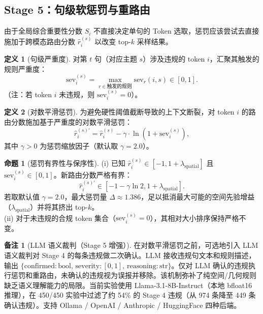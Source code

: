 \documentclass[11pt,a4paper]{article}
\theoremstyle{definition}
\newtheorem{definition}{定义}[section]
\newtheorem{proposition}{命题}[section]
\newtheorem{remark}{备注}[section]
\begin{document}
\subsection{Stage 5：句级软惩罚与重路由}

由于全局综合重要性分数 $S_i$ 不直接决定单句的 Token 选取，惩罚应该尝试去直接施加于跨模态路由分数 $\hat{r}_i^{(s)}$ 以改变 top-$k$ 采样结果。

\begin{definition}[句级严重度]
对第 $t$ 句（对应主题 $s$）涉及违规的 token $i$，汇聚其触发的规则严重度：
\begin{equation}
\mathrm{sev}_i^{(s)} = \max_{r \in \text{触发的规则}} \mathrm{sev}_r(i, s) \in [0,1].
\end{equation}
（注：若 token $i$ 未违规，则 $\mathrm{sev}_i^{(s)} = 0$）。
\end{definition}

\begin{definition}[对数平滑惩罚]
为避免硬性阈值截断导致的上下文断裂，对 token $i$ 的路由分数施加基于严重度的对数平滑惩罚：
\begin{equation}\label{eq:penalty}
\hat{r}_i^{(s)\prime} = \hat{r}_i^{(s)} - \gamma \cdot \ln(1 + \mathrm{sev}_i^{(s)}),
\end{equation}
其中 $\gamma > 0$ 为惩罚缩放因子（默认取 $\gamma = 2.0$）。
\end{definition}

\begin{proposition}[惩罚有界性与保序性]
(i) 已知 $\hat{r}_i^{(s)} \in [-1, 1+\lambda_{\text{spatial}}]$ 且 $\mathrm{sev}_i^{(s)} \in [0,1]$。新路由分数严格有界：
\begin{equation}
\hat{r}_i^{(s)\prime} \in [-1 - \gamma \ln 2, 1+\lambda_{\text{spatial}}].
\end{equation}
若取默认值 $\gamma=2.0$，最大惩罚量 $\Delta \approx 1.386$，足以抵消最大可能的空间先验增益（$\lambda_{\text{spatial}}$）并将其挤出 top-$k$。\\
(ii) 对于未违规的合规 token 集合（$\mathrm{sev}_i^{(s)} = 0$），其相对大小排序保持严格不变。
\end{proposition}

\begin{remark}[LLM 语义裁判（Stage 5 增强）]\label{rmk:llm_judge}
在对数平滑惩罚之前，可选地引入 LLM 语义裁判对 Stage 4 的每条违规做二次确认。LLM 接收违规句文本和规则描述，输出 $\{\mathrm{confirmed}: \mathrm{bool},\, \mathrm{severity}: [0,1],\, \mathrm{reasoning}: \mathrm{str}\}$。仅对 LLM 确认的违规执行惩罚和重路由，未确认的违规视为误报并移除。该机制弥补了纯空间/几何规则缺乏语义理解能力的局限。当前实验使用 Llama-3.1-8B-Instruct（本地 bfloat16 推理），在 450/450 实验中过滤了约 54\% 的 Stage 4 违规（从 974 条降至 449 条确认违规）。支持 Ollama / OpenAI / Anthropic / HuggingFace 四种后端。
\end{remark}
\end{document}

